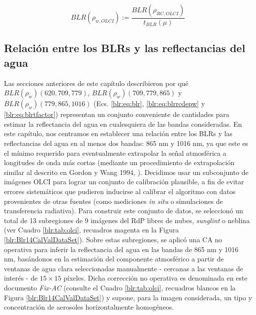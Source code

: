         \begin{equation}
            BLR(\rho_{w,OLCI}) := \frac{BLR(\rho_{RC,OLCI})}{t_{BLR}(\mu)}
            \label{blr:eq:blrtolcifactor}
        \end{equation}
        
    \subsection{Relación entre los BLRs y las reflectancias del agua}
    \label{blr:s:blrrhow}

        Las secciones anteriores de este capítulo describieron por qué $BLR(\rho_{w})(620,709,779)$, $BLR(\rho_{w})(709,779,865)$ y $BLR(\rho_{w})(779,865,1016)$ (Ecs. \ref{blr:eq:blr}, \ref{blr:eq:blrrcdepw} y \ref{blr:eq:blrtfactor}) representan un conjunto conveniente de cantidades para estimar la reflectancia del agua en cualesquiera de las bandas consideradas. En este capítulo, nos centramos en establecer una relación entre los BLRs y las reflectancias del agua en al menos dos bandas: 865 nm y 1016 nm, ya que este es el mínimo requerido para eventualmente extrapolar la señal atmosférica a longitudes de onda más cortas (mediante un procedimiento de extrapolación similar al descrito en Gordon y Wang 1994, \cite{gordon1994}).
        Decidimos usar un subconjunto de imágenes OLCI para lograr un conjunto de calibración plausible, a fin de evitar errores sistemáticos que pudieren inducirse al calibrar el algoritmo con datos provenientes de otras fuentes (como mediciones \textit{in situ} o simulaciones de transferencia radiativa).
        Para construir este conjunto de datos, se seleccionó un total de 13 subregiones de 9 imágenes del RdP libres de nubes, \textit{sunglint} o neblina (ver Cuadro \ref{blr:tab:olci}, recuadros magenta en la Figura \ref{blr:Blr14CalValDataSet}). Sobre estas subregiones, se aplicó una CA no operativa para inferir la reflectancia del agua en las bandas de 865 nm y 1016 nm, basándonos en la estimación del componente atmosférico a partir de ventanas de agua clara seleccionadas manualmente - cercanas a las ventanas de interés - de $15 \times 15$ píxeles. Dicha corrección no operativa es denominada en este documento \textit{Fix-AC} (consulte el Cuadro \ref{blr:tab:olci}, recuadros blancos en la Figura \ref{blr:Blr14CalValDataSet}) y supone, para la imagen considerada, un tipo y concentración de aerosoles horizontalmente homogéneos.
        
